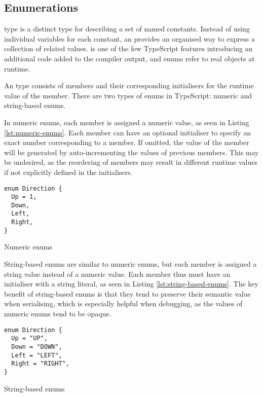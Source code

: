 \subsection{Enumerations}

 type is a distinct type for describing a set of named constants. Instead of using individual variables for each constant, an  provides an organised way to express a collection of related values.  is one of the few TypeScript features introducing an additional code added to the compiler output, and enums refer to real objects at runtime.

An  type consists of members and their corresponding initialisers for the runtime value of the member. There are two types of enums in TypeScript: numeric and string-based enums.

\clearpage

In numeric enums, each member is assigned a numeric value, as seen in Listing \ref{lst:numeric-enums}. Each member can have an optional initialiser to specify an exact number corresponding to a member. If omitted, the value of the member will be generated by auto-incrementing the values of previous  members. This may be undesired, as the reordering of members may result in different runtime values if not explicitly defined in the initialisers.

\begin{listing}[ht]
  \begin{verbatim}
enum Direction {
  Up = 1,
  Down,
  Left,
  Right,
}
\end{verbatim}
  \caption{Numeric enums}\label{lst:numeric-enums}
\end{listing}

String-based enums are similar to numeric enums, but each member is assigned a string value instead of a numeric value. Each member thus must have an initialiser with a string literal, as seen in Listing \ref{lst:string-based-enums}. The key benefit of string-based enums is that they tend to preserve their semantic value when serialising, which is especially helpful when debugging, as the values of numeric enums tend to be opaque.

\begin{listing}[ht]
  \begin{verbatim}
enum Direction {
  Up = "UP",
  Down = "DOWN",
  Left = "LEFT",
  Right = "RIGHT",
}
\end{verbatim}
  \caption{String-based enums}\label{lst:string-based-enums}
\end{listing}

